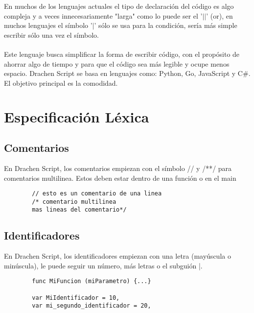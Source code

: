 \documentclass[https://www.overleaf.com/project/63761df255a8a9f4a15c3579
	letterpaper, %
	10pt, %
]{CSUniSchoolLabReport}
\begin{document}
    En muchos de los lenguajes actuales el tipo de declaración del código es algo compleja y a veces innecesariamente  "larga" como lo puede ser el '\(||\)' (or), en muchos lenguajes el símbolo '\(|\)' sólo se usa para la condición, sería más simple escribir sólo una vez el símbolo. 
    \\\\
    Este lenguaje busca simplificar la forma de escribir código, con el propósito de ahorrar algo de tiempo y para que el código sea más legible y ocupe menos espacio. Drachen Script se basa en lenguajes como: Python, Go, JavaScript y C\#. El objetivo principal es la comodidad.
    
    
    \section{Especificación Léxica}
    
    \subsection{Comentarios}
    En Drachen Script, los comentarios empiezan con el símbolo // y /**/ para comentarios multilinea. Estos deben estar dentro de una función o en el main \\
    
    \begin{lstlisting}
        // esto es un comentario de una linea
        /* comentario multilinea 
        mas lineas del comentario*/
    \end{lstlisting}
    
    \subsection{Identificadores}
    En Drachen Script, los identificadores empiezan con una letra (mayúscula o minúscula), le puede seguir un número, más letras o el subguión |. \\
    
    \begin{lstlisting}
        func MiFuncion (miParametro) {...}
        
        var MiIdentificador = 10,
        var mi_segundo_identificador = 20,
    \end{lstlisting}
    
\end{document}
